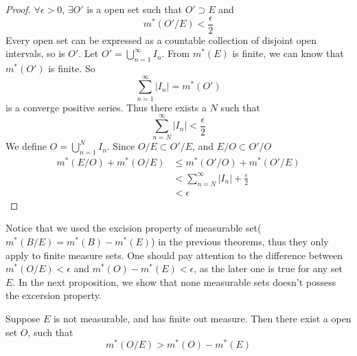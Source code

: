 \documentclass[lang=en, 12pt]{elegantbook}
\begin{document}
            \begin{proof}
                $\forall \epsilon > 0$, $\exists O'$ is a open set such that $O' \supset E$ and 
                \begin{equation*}
                    m^*(O'/E) < \frac{\epsilon}{2} 
                \end{equation*}
                Every open set can be expressed as a countable collection of disjoint open intervals, so is $O'$. Let $O' = \bigcup_{n=1}^{\infty} I_n$.
            From $m^*(E)$ is finite, we can know that $m^*(O')$ is finite. So
            $$\sum_{n=1}^{\infty}|I_n|=m^*(O')$$
            is a converge positive series. Thus there exists a $N$ such that 
            $$\sum_{n=N}^{\infty}|I_n| < \frac{\epsilon}{2}$$
                We define $O =\bigcup_{n=1}^{N}I_n$. Since $O/E \subset O'/E$, and $E/O \subset O'/O$
                \begin{equation*}
                    \begin{aligned}
                        m^*(E/O)+m^*(O/E) &\leq  m^*(O'/O)+m^*(O'/E)\\
                        &< \sum_{n=N}^{\infty}|I_n| + \frac{\epsilon}{2}\\
                        &< \epsilon
                    \end{aligned}
                \end{equation*}
            \end{proof}
            Notice that we used the excision property of measurable set($m^*(B/E) = m^*(B) - m^*(E)$) in the previous theorems, thus they only
        apply to finite measure sets. One should pay attention to the difference between $m^*(O/E) < \epsilon$ and $m^*(O)-m^*(E)<\epsilon$, 
        as the later one is true for any set $E$. In the next proposition, we show that none measurable sets doesn't possess the excersion 
        property.
            \begin{proposition}
                Suppose $E$ is not measurable, and has finite out measure. Then there exist a open set $O$, such that 
                $$m^*(O/E) > m^*(O) - m^*(E)$$
            \end{proposition}
\end{document}

